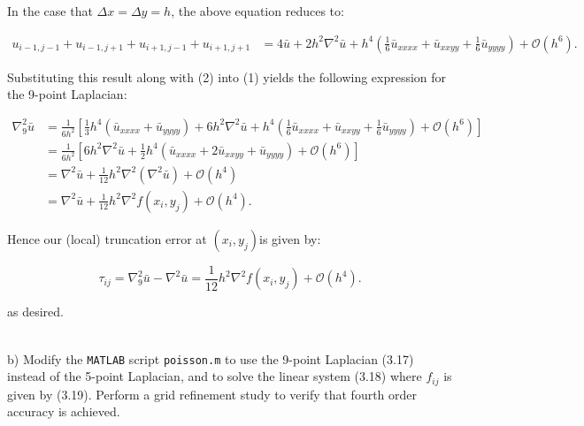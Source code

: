 \begin{solution}
   In the case that $\Delta x = \Delta y = h$, the above equation reduces to:

   \begin{align*}
      u_{i-1, j-1} + u_{i-1, j+1} + u_{i+1, j-1} + u_{i+1, j+1} &= 4 \bar{u} + 2 h^2 \nabla^2 \bar{u}
                                                                   + h^4 \left(\frac{1}{6}\bar{u}_{xxxx} + \bar{u}_{xxyy} +  \frac{1}{6}\bar{u}_{yyyy}\right) + \mathcal{O}(h^6).
   \end{align*}

   \pagebreak
   Substituting this result along with (2) into (1) yields the following expression for the 9-point Laplacian:

   \begin{align*}
      \nabla_9^2 \bar{u} &= \frac{1}{6h^2} \left[
                           \frac{1}{3} h^4 (\bar{u}_{xxxx} + \bar{u}_{yyyy}) + 6 h^2 \nabla^2 \bar{u}
                              + h^4 \left(\frac{1}{6}\bar{u}_{xxxx} + \bar{u}_{xxyy} + \frac{1}{6}\bar{u}_{yyyy}\right) + \mathcal{O}(h^6)
                           \right] \\
                         &= \frac{1}{6h^2} \left[
                              6 h^2 \nabla^2 \bar{u} 
                              + \frac{1}{2} h^4 \left(\bar{u}_{xxxx} + 2 \bar{u}_{xxyy} + \bar{u}_{yyyy}\right) 
                              + \mathcal{O}(h^6)
                           \right] \\
                         &= \nabla^2 \bar{u} + \frac{1}{12} h^2 \nabla^2(\nabla^2 \bar{u}) + \mathcal{O}(h^4) \\
                         &= \nabla^2 \bar{u} + \frac{1}{12} h^2 \nabla^2 f(x_i, y_j) + \mathcal{O}(h^4).
   \end{align*}

   Hence our (local) truncation error at $(x_i, y_j)$is given by:
   
   $$
      \tau_{ij} = \nabla_9^2 \bar{u} - \nabla^2 \bar{u} = \frac{1}{12} h^2 \nabla^2 f(x_i, y_j) + \mathcal{O}(h^4).
   $$

   as desired.
   \ \\\\
\end{solution}

\pagebreak
b) Modify the \texttt{MATLAB} script \texttt{poisson.m} to use the 9-point Laplacian (3.17) instead of the 5-point
   Laplacian, and to solve the linear system (3.18) where $f_{ij}$ is given by (3.19). Perform a grid refinement study
   to verify that fourth order accuracy is achieved.

